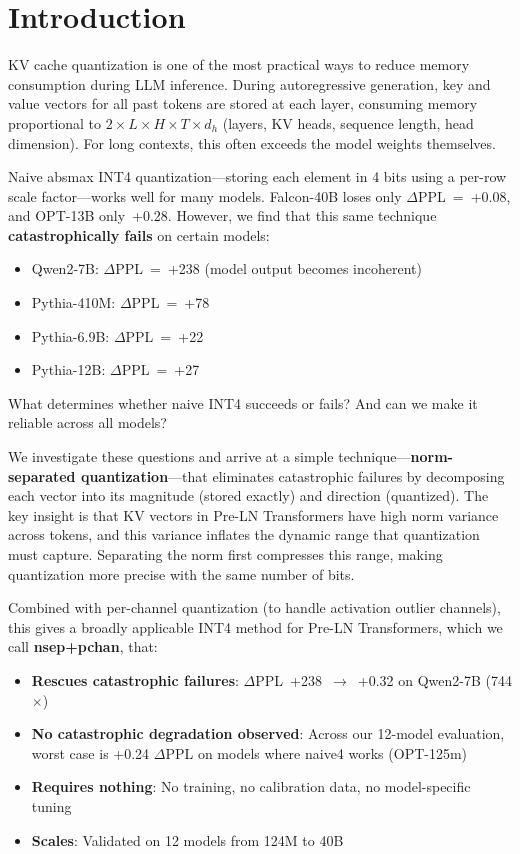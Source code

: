\documentclass[11pt]{article}
\begin{document}
\begin{abstract}
\end{abstract}

\section{Introduction}

KV cache quantization is one of the most practical ways to reduce memory consumption during LLM inference. During autoregressive generation, key and value vectors for all past tokens are stored at each layer, consuming memory proportional to $2 \times L \times H \times T \times d_h$ (layers, KV heads, sequence length, head dimension). For long contexts, this often exceeds the model weights themselves.

Naive absmax INT4 quantization---storing each element in 4 bits using a per-row scale factor---works well for many models. Falcon-40B loses only $\Delta$PPL~=~+0.08, and OPT-13B only~+0.28. However, we find that this same technique \textbf{catastrophically fails} on certain models:
\begin{itemize}[nosep]
  \item Qwen2-7B: $\Delta$PPL~=~+238 (model output becomes incoherent)
  \item Pythia-410M: $\Delta$PPL~=~+78
  \item Pythia-6.9B: $\Delta$PPL~=~+22
  \item Pythia-12B: $\Delta$PPL~=~+27
\end{itemize}

What determines whether naive INT4 succeeds or fails? And can we make it reliable across all models?

We investigate these questions and arrive at a simple technique---\textbf{norm-separated quantization}---that eliminates catastrophic failures by decomposing each vector into its magnitude (stored exactly) and direction (quantized). The key insight is that KV vectors in Pre-LN Transformers have high norm variance across tokens, and this variance inflates the dynamic range that quantization must capture. Separating the norm first compresses this range, making quantization more precise with the same number of bits.

Combined with per-channel quantization (to handle activation outlier channels), this gives a broadly applicable INT4 method for Pre-LN Transformers, which we call \textbf{nsep+pchan}, that:
\begin{itemize}[nosep]
  \item \textbf{Rescues catastrophic failures}: $\Delta$PPL~+238~$\to$~+0.32 on Qwen2-7B (744$\times$)
  \item \textbf{No catastrophic degradation observed}: Across our 12-model evaluation, worst case is +0.24 $\Delta$PPL on models where naive4 works (OPT-125m)
  \item \textbf{Requires nothing}: No training, no calibration data, no model-specific tuning
  \item \textbf{Scales}: Validated on 12 models from 124M to 40B
\end{itemize}
\end{document}
